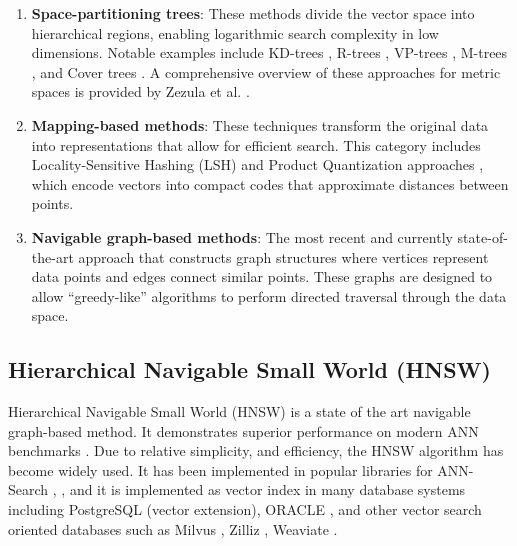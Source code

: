 \documentclass{article}
\begin{document}
\begin{enumerate}
    \item \textbf{Space-partitioning trees}: These methods divide the vector space into hierarchical regions, enabling logarithmic search complexity in low dimensions. Notable examples include KD-trees \cite{bentley1990k}, R-trees \cite{guttman1984r}, VP-trees \cite{yianilos1993}, M-trees \cite{ciaccia1997m}, and Cover trees \cite{beygelzimer2006cover}. A comprehensive overview of these approaches for metric spaces is provided by Zezula et al. \cite{zezula2006similarity}.

    \item \textbf{Mapping-based methods}: These techniques transform the original data into representations that allow for efficient search. This category includes Locality-Sensitive Hashing (LSH) \cite{Indyk1998,Gionis1999,Datar2004,Andoni2006,Andoni2015} and Product Quantization approaches \cite{Jegou2011,Ge2013,Norouzi2013}, which encode vectors into compact codes that approximate distances between points.

    \item \textbf{Navigable graph-based methods}: The most recent and currently state-of-the-art approach that constructs graph structures where vertices represent data points and edges connect similar points. These graphs are designed to allow ``greedy-like'' algorithms to perform directed traversal through the data space.
\end{enumerate}

\subsection{Hierarchical Navigable Small World (HNSW)}

Hierarchical Navigable Small World (HNSW) \cite{hnsw} is a state of the art navigable graph-based method. It demonstrates superior performance on modern ANN benchmarks \cite{aumuller2020ann}. Due to relative simplicity, and efficiency, the HNSW algorithm has become widely used. It has been implemented in popular libraries for ANN-Search \cite{faiss}, \cite{nmspacelib}, and it is implemented as vector index in many database systems including PostgreSQL (vector extension), ORACLE \cite{OracleHNSW2023}, and other vector search oriented databases such as Milvus \cite{MilvusHNSW2024}, Zilliz \cite{ZillizHNSW2022}, Weaviate \cite{WeaviateVectorIndex2024}.  

\end{document}
